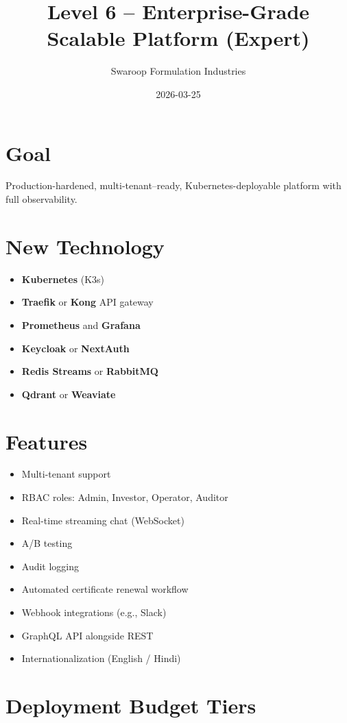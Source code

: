 \documentclass{article}
\title{Level 6 -- Enterprise-Grade Scalable Platform (Expert)}
\author{Swaroop Formulation Industries}
\date{2026-03-25}
\begin{document}
\maketitle

\section{Goal}

Production-hardened, multi-tenant--ready, Kubernetes-deployable platform with full observability.

\section{New Technology}

\begin{itemize}[leftmargin=*]
  \item \textbf{Kubernetes} (K3s)
  \item \textbf{Traefik} or \textbf{Kong} API gateway
  \item \textbf{Prometheus} and \textbf{Grafana}
  \item \textbf{Keycloak} or \textbf{NextAuth}
  \item \textbf{Redis Streams} or \textbf{RabbitMQ}
  \item \textbf{Qdrant} or \textbf{Weaviate}
\end{itemize}

\section{Features}

\begin{itemize}[leftmargin=*]
  \item Multi-tenant support
  \item RBAC roles: Admin, Investor, Operator, Auditor
  \item Real-time streaming chat (WebSocket)
  \item A/B testing
  \item Audit logging
  \item Automated certificate renewal workflow
  \item Webhook integrations (e.g., Slack)
  \item GraphQL API alongside REST
  \item Internationalization (English / Hindi)
\end{itemize}

\section{Deployment Budget Tiers}
\end{document}
